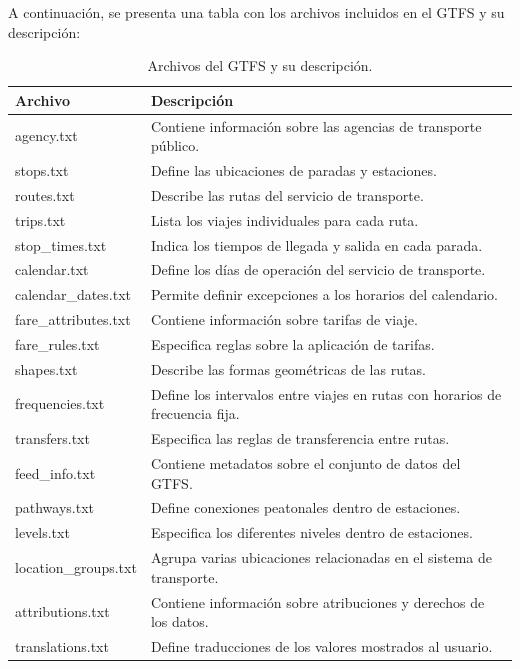 \documentclass[11pt]{article}
\begin{document}
		A continuación, se presenta una tabla con los archivos incluidos en el GTFS y su descripción:

		\begin{table}[h]
			\centering
			\begin{tabular}{|l|p{10cm}|}
				\hline
				\textbf{Archivo} & \textbf{Descripción} \\
				\hline
				agency.txt & Contiene información sobre las agencias de transporte público. \\
				stops.txt & Define las ubicaciones de paradas y estaciones. \\
				routes.txt & Describe las rutas del servicio de transporte. \\
				trips.txt & Lista los viajes individuales para cada ruta. \\
				stop\_times.txt & Indica los tiempos de llegada y salida en cada parada. \\
				calendar.txt & Define los días de operación del servicio de transporte. \\
				calendar\_dates.txt & Permite definir excepciones a los horarios del calendario. \\
				fare\_attributes.txt & Contiene información sobre tarifas de viaje. \\
				fare\_rules.txt & Especifica reglas sobre la aplicación de tarifas. \\
				shapes.txt & Describe las formas geométricas de las rutas. \\
				frequencies.txt & Define los intervalos entre viajes en rutas con horarios de frecuencia fija. \\
				transfers.txt & Especifica las reglas de transferencia entre rutas. \\
				feed\_info.txt & Contiene metadatos sobre el conjunto de datos del GTFS. \\
				pathways.txt & Define conexiones peatonales dentro de estaciones. \\
				levels.txt & Especifica los diferentes niveles dentro de estaciones. \\
				location\_groups.txt & Agrupa varias ubicaciones relacionadas en el sistema de transporte. \\
				attributions.txt & Contiene información sobre atribuciones y derechos de los datos. \\
				translations.txt & Define traducciones de los valores mostrados al usuario. \\

				\hline
			\end{tabular}
			\caption{Archivos del GTFS y su descripción.}
			\label{tab:gtfs_files}
		\end{table}
\end{document}
